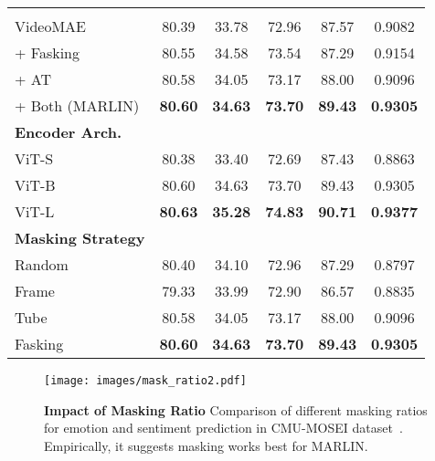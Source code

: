 \documentclass[10pt,twocolumn,letterpaper]{article}
\begin{document}
\begin{table}[b]
{\begin{tabular}{l||ccc||cc}
\begin{tabular}[c]{@{}c@{}}
\textbf{Modules}   & & & & &  \\
VideoMAE        & 80.39                                                                     & 33.78               & 72.96               & 87.57                                                    & 0.9082               \\
+ Fasking & 80.55                                                                     & 34.58               & 73.54               &  87.29                                                    & 0.9154               \\
+ AT  & 80.58                                                                     & 34.05               & 73.17               & 88.00                                                      & 0.9096               \\
+ Both (MARLIN)         & \textbf{80.60}                                                                      & \textbf{34.63}               & \textbf{73.70}                 & \textbf{89.43}                                                    & \textbf{0.9305}   \\  \hline \hline
\textbf{Encoder Arch.}  & & & & &  \\ 
ViT-S & 80.38 & 33.40 & 72.69 & 87.43 & 0.8863 \\
ViT-B & 80.60 & 34.63 & 73.70 & 89.43 & 0.9305 \\  
ViT-L & \textbf{80.63} & \textbf{35.28} & \textbf{74.83} & \textbf{90.71} & \textbf{0.9377} \\ \hline \hline
\textbf{Masking Strategy}  & & & & &  \\ 
Random & 80.40 & 34.10 & 72.96 & 87.29 & 0.8797 \\
Frame & 79.33 & 33.99 & 72.90 & 86.57 & 0.8835 \\
Tube & 80.58 & 34.05 & 73.17 & 88.00 & 0.9096 \\
Fasking & \textbf{80.60} & \textbf{34.63} & \textbf{73.70} & \textbf{89.43} & \textbf{0.9305} \\   
\bottomrule[0.4mm]
\end{tabular}}
\end{table}

\begin{figure}[t]
    \centering
    \texttt{[image: images/mask\_ratio2.pdf]}
    \caption{\textbf{Impact of Masking Ratio} Comparison of different masking ratios for emotion and sentiment prediction in CMU-MOSEI dataset~\cite{bagherzadehMultimodal2018}. Empirically, it suggests  masking works best for MARLIN.
    }
    \label{fig:masking_ratio}
    \vspace{-6mm}
\end{figure}
\end{document}
